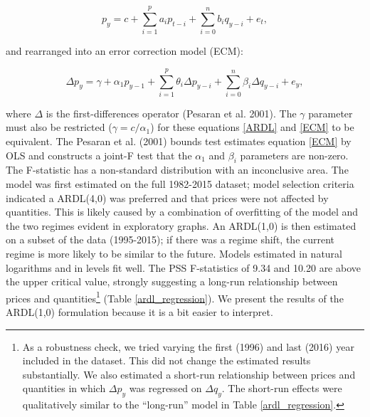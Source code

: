 \documentclass[]{article}
\let\rmarkdownfootnote\footnote%
\def\footnote{\protect\rmarkdownfootnote}
\begin{document}
\begin{equation}
\label{ARDL}
p_{y}= c+\sum_{i=1}^p a_i p_{t-i}+ \sum_{i=0}^n b_i q_{y-i} + e_{t},
\end{equation}

and rearranged into an error correction model (ECM):

\begin{equation}
\label{ECM}
\Delta p_y= \gamma+ \alpha_1 p_{y-1} + \sum_{i=1}^p \theta_i \Delta p_{y-i}+ \sum_{i=0}^n  \beta_i \Delta q_{y-i} + e_{y},
\end{equation}

where \(\Delta\) is the first-differences operator (Pesaran et al.
2001). The \(\gamma\) parameter must also be restricted
(\(\gamma=c / \alpha_1\)) for these equations \ref{ARDL} and \ref{ECM}
to be equivalent. The Pesaran et al. (2001) bounds test estimates
equation \ref{ECM} by OLS and constructs a joint-F test that the
\(\alpha_1\) and \(\beta_i\) parameters are non-zero. The F-statistic
has a non-standard distribution with an inconclusive area. The model was
first estimated on the full 1982-2015 dataset; model selection criteria
indicated a ARDL(4,0) was preferred and that prices were not affected by
quantities. This is likely caused by a combination of overfitting of the
model and the two regimes evident in exploratory graphs. An ARDL(1,0) is
then estimated on a subset of the data (1995-2015); if there was a
regime shift, the current regime is more likely to be similar to the
future. Models estimated in natural logarithms and in levels fit well.
The PSS F-statistics of 9.34 and 10.20 are above the upper critical
value, strongly suggesting a long-run relationship between prices and
quantities\footnote{As a robustness check, we tried varying the first
  (1996) and last (2016) year included in the dataset. This did not
  change the estimated results substantially. We also estimated a
  short-run relationship between prices and quantities in which
  \(\Delta p_y\) was regressed on \(\Delta q_y\). The short-run effects
  were qualitatively similar to the ``long-run'' model in Table
  \ref{ardl_regression}.} (Table \ref{ardl_regression}). We present the
results of the ARDL(1,0) formulation because it is a bit easier to
interpret.
\end{document}
